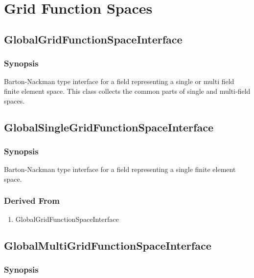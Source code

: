 \documentclass[11pt,a4paper,DIV11,%
notitlepage,oneside,abstracton,%
bibtotoc]{scrartcl}
\begin{document}
\section{Grid Function Spaces}

\subsection{GlobalGridFunctionSpaceInterface}

\subsubsection{Synopsis}

Barton-Nackman type interface for a field representing a single or
multi field finite element space. This class collects the common parts
of single and multi-field spaces.

\subsection{GlobalSingleGridFunctionSpaceInterface}

\subsubsection{Synopsis}

Barton-Nackman type interface for a field representing a single finite
element space. 

\subsubsection{Derived From}

\begin{enumerate}[1)]
\item GlobalGridFunctionSpaceInterface
\end{enumerate}

\subsection{GlobalMultiGridFunctionSpaceInterface}

\subsubsection{Synopsis}
\end{document}
